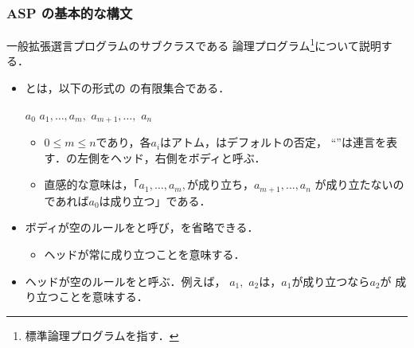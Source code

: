 \documentclass[dvipdfmx,11pt]{beamer}
\begin{document}
\begin{frame}\frametitle{ASP の基本的な構文}

  一般拡張選言プログラムのサブクラスである
  論理プログラム\footnote{標準論理プログラムを指す．}について説明する．

  \begin{itemize}
    \item {}とは，以下の形式の
          の有限集合である．
          \begin{block}{}
            \centering
            $a_0$ \code{:-} $a_1, \dots, a_m,$  $a_{m+1}, \dots,$  $a_{n}$
          \end{block}
          \begin{itemize}
            \item $0 \le m \le n$であり，各$a_i$はアトム，はデフォルトの否定，
                  ``\code{,}''は連言を表す．\code{:-}の左側をヘッド，右側をボディと呼ぶ．
            \item 直感的な意味は，「$a_1, \dots, a_m,$が成り立ち，$a_{m+1}, \dots, a_{n}$
                  が成り立たないのであれば$a_{0}$は成り立つ」である．
          \end{itemize}       
    \item ボディが空のルールをと呼び，\code{:-}を省略できる．
          \begin{itemize}
            \item ヘッドが常に成り立つことを意味する．
          \end{itemize}
    \item ヘッドが空のルールをと呼ぶ．例えば，
          \code{:-} $a_1,$  $a_2$は，$a_1$が成り立つなら$a_2$が
          成り立つことを意味する．
  \end{itemize}
  
\end{frame}
\end{document}
